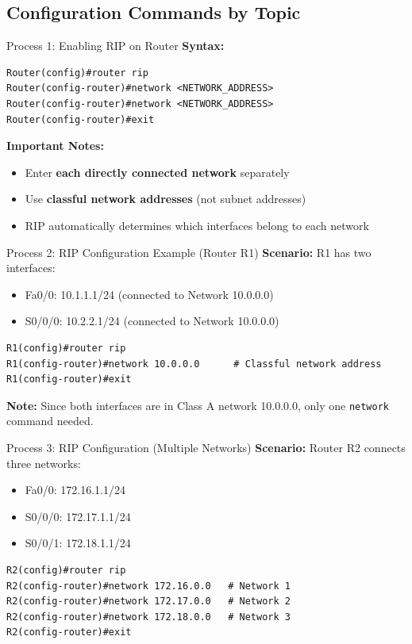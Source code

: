 \documentclass[12pt,a4paper]{article}
\begin{document}
\subsection{Configuration Commands by Topic}

\begin{commandbox}{Process 1: Enabling RIP on Router}
\textbf{Syntax:}
\begin{lstlisting}
Router(config)#router rip
Router(config-router)#network <NETWORK_ADDRESS>
Router(config-router)#network <NETWORK_ADDRESS>
Router(config-router)#exit
\end{lstlisting}

\textbf{Important Notes:}
\begin{itemize}[noitemsep]
    \item Enter \textbf{each directly connected network} separately
    \item Use \textbf{classful network addresses} (not subnet addresses)
    \item RIP automatically determines which interfaces belong to each network
\end{itemize}
\end{commandbox}

\begin{commandbox}{Process 2: RIP Configuration Example (Router R1)}
\textbf{Scenario:} R1 has two interfaces:
\begin{itemize}[noitemsep]
    \item Fa0/0: 10.1.1.1/24 (connected to Network 10.0.0.0)
    \item S0/0/0: 10.2.2.1/24 (connected to Network 10.0.0.0)
\end{itemize}

\begin{lstlisting}
R1(config)#router rip
R1(config-router)#network 10.0.0.0      # Classful network address
R1(config-router)#exit
\end{lstlisting}

\textbf{Note:} Since both interfaces are in Class A network 10.0.0.0, only one \texttt{network} command needed.
\end{commandbox}

\begin{commandbox}{Process 3: RIP Configuration (Multiple Networks)}
\textbf{Scenario:} Router R2 connects three networks:
\begin{itemize}[noitemsep]
    \item Fa0/0: 172.16.1.1/24
    \item S0/0/0: 172.17.1.1/24
    \item S0/0/1: 172.18.1.1/24
\end{itemize}

\begin{lstlisting}
R2(config)#router rip
R2(config-router)#network 172.16.0.0   # Network 1
R2(config-router)#network 172.17.0.0   # Network 2
R2(config-router)#network 172.18.0.0   # Network 3
R2(config-router)#exit
\end{lstlisting}
\end{commandbox}
\end{document}
